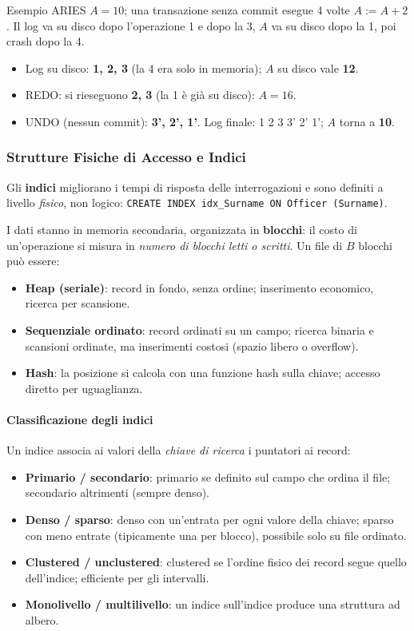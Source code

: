 \documentclass[12pt]{extarticle}
\begin{document}
\begin{cbox}{Esempio ARIES}
$A = 10$; una transazione senza commit esegue 4 volte $A := A+2$. Il log va su disco dopo l'operazione 1 e dopo la 3, $A$ va su disco dopo la 1, poi crash dopo la 4.
\begin{itemize}
    \item Log su disco: \textbf{1, 2, 3} (la 4 era solo in memoria); $A$ su disco vale \textbf{12}.
    \item REDO: si rieseguono \textbf{2, 3} (la 1 è già su disco): $A = 16$.
    \item UNDO (nessun commit): \textbf{3', 2', 1'}. Log finale: 1 2 3 3' 2' 1'; $A$ torna a \textbf{10}.
\end{itemize}
\end{cbox}

\subsubsection{Strutture Fisiche di Accesso e Indici}

\noindent Gli \textbf{indici} migliorano i tempi di risposta delle interrogazioni e sono definiti a livello \textit{fisico}, non logico: \texttt{CREATE INDEX idx\_Surname ON Officer (Surname)}.

\noindent I dati stanno in memoria secondaria, organizzata in \textbf{blocchi}: il costo di un'operazione si misura in \emph{numero di blocchi letti o scritti}. Un file di $B$ blocchi può essere:
\begin{itemize}
    \item \textbf{Heap (seriale)}: record in fondo, senza ordine; inserimento economico, ricerca per scansione.
    \item \textbf{Sequenziale ordinato}: record ordinati su un campo; ricerca binaria e scansioni ordinate, ma inserimenti costosi (spazio libero o overflow).
    \item \textbf{Hash}: la posizione si calcola con una funzione hash sulla chiave; accesso diretto per uguaglianza.
\end{itemize}

\paragraph{Classificazione degli indici}
Un indice associa ai valori della \textit{chiave di ricerca} i puntatori ai record:
\begin{itemize}
    \item \textbf{Primario / secondario}: primario se definito sul campo che ordina il file; secondario altrimenti (sempre denso).
    \item \textbf{Denso / sparso}: denso con un'entrata per ogni valore della chiave; sparso con meno entrate (tipicamente una per blocco), possibile solo su file ordinato.
    \item \textbf{Clustered / unclustered}: clustered se l'ordine fisico dei record segue quello dell'indice; efficiente per gli intervalli.
    \item \textbf{Monolivello / multilivello}: un indice sull'indice produce una struttura ad albero.
\end{itemize}
\end{document}
